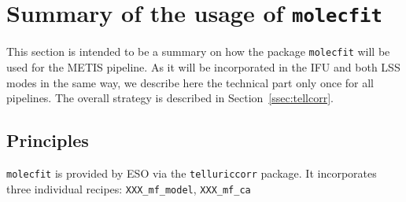 \section{Summary of the usage of \texttt{molecfit}}\label{app:mf}
This section is intended to be a summary on how the package \texttt{molecfit} will be used for the METIS pipeline. As it will be incorporated in the \ac{IFU} and both \ac{LSS} modes in the same way, we describe here the technical part only once for all pipelines. The overall strategy is described in Section~\ref{ssec:tellcorr}.
\subsection{Principles}\label{app:mf_principles}
\texttt{molecfit} is provided by \ac{ESO} via the \texttt{telluriccorr} package. It incorporates three individual recipes: \texttt{XXX_mf_model}, \texttt{XXX_mf_ca}

